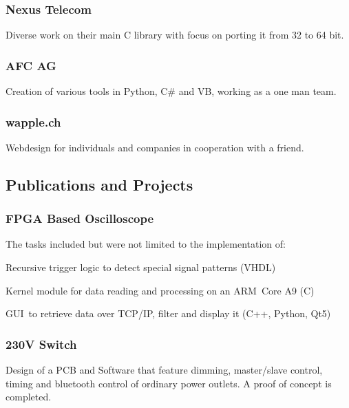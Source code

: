 \documentclass[]{resume}
\begin{document}
\begin{timeline}
\subsubsection{Nexus Telecom}
Diverse work on their main C library with focus on porting it from 32 to 64 bit.
\sectionsep

\subsubsection{AFC AG}
Creation of various tools in Python, C\# and VB, working as a one man team.
\sectionsep

\subsubsection{wapple.ch}
Webdesign for individuals and companies in cooperation with a friend.
\sectionsep


\subsection{Publications and Projects}

\subsubsection{FPGA Based Oscilloscope}
The tasks included but were not limited to the implementation of:
\begin{tightemize}
\item Recursive trigger logic to detect special signal patterns (VHDL)
\item Kernel module for data reading and processing on an ARM Core A9 (C)
\item GUI to retrieve data over TCP/IP, filter and display it (C++, Python, Qt5)
\end{tightemize}
\sectionsep

\subsubsection{230V Switch}
Design of a PCB and Software that feature dimming, master/slave control, timing and bluetooth control of ordinary power outlets. A proof of concept is completed.
\sectionsep

\end{timeline}
\end{document}

